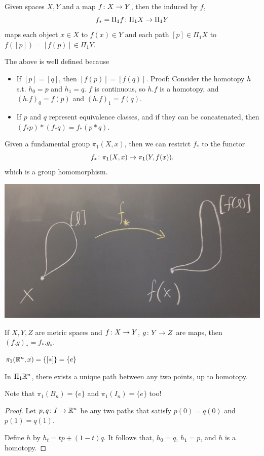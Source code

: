 \documentclass[11pt,leqno,oneside]{amsart}
\numberwithin{thm}{section}
\newcommand{\fund}[1][1]{\pi_{#1}}
\begin{document}
\begin{defn}
  Given spaces $X, Y$ and a map $f\colon X \to Y$, then the
   induced by $f$,
  $$f_* = \Pi_1 f \colon \Pi_1 X \to \Pi_1 Y$$ maps each object $x \in X$
  to $f(x) \in Y$ and each path $[p] \in \Pi_1 X$ to
  $f([p]) = [f(p)] \in \Pi_1 Y$.
\end{defn}
\begin{prop}
  The above is well defined because
  \begin{itemize}
  \item If $[p]=[q]$, then $[f(p)] = [f(q)]$.  Proof:  Consider the homotopy $h$ s.t. $h_0 = p$ and $h_1 = q$.  $f$ is continuous, so $h.f$ is a homotopy, and $(h.f)_0 = f(p)$ and $(h.f)_1 = f(q)$.
  \item If $p$ and $q$ represent equivalence classes, and if they can be concatenated, then $(f_*p)*(f_*q) = f_*(p*q)$.
  \end{itemize}
\end{prop}

\begin{prop}
  Given a fundamental group $\fund(X, x)$, then we can restrict $f_*$
  to the functor $$f_* \from \fund(X, x) \to \fund(Y, f(x)).$$ which is a group homomorphism.

  \includegraphics[scale=0.17]{images/fundamental-functor}
\end{prop}
\begin{prop}
  If $X,Y,Z$ are metric spaces and $f \colon X \to Y$, $g \colon Y \to Z$ are
  maps, then ${(f.g)}_* = f_*.g_*$.
\end{prop}

\begin{example}
  $\fund(\R^n, x) = \{[*]\} = \{e\}$

  In $\Pi_1 {\mathbb R}^n$, there exists a unique path between any two points,
  up to homotopy.

  Note that $\fund(B_n) = \{e\}$ and $\fund(I_n) = \{e\}$ too!
\end{example}
\begin{proof}
  Let $p,q \colon I \to {\mathbb R}^n$ be any two paths that satisfy $p(0) = q(0)$ and $p(1) = q(1)$.

  Define $h$ by $h_t = tp + (1-t)q$.  It follows that, $h_0 = q$, $h_1 = p$, and $h$ is a homotopy.
\end{proof}
\end{document}
